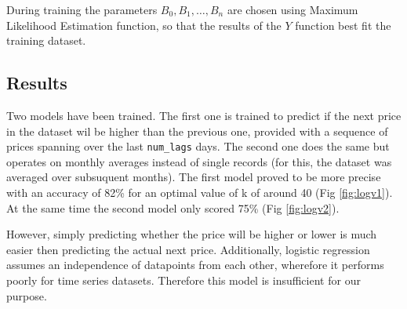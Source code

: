 During training the parameters \(B_0, B_1, \ldots, B_n\) are chosen using Maximum Likelihood Estimation function, so that the results of the \(Y\) function best fit the training dataset.

\subsection{Results}
Two models have been trained.
The first one is trained to predict if the next price in the dataset wil be higher than the previous one, provided with a sequence of prices spanning over the last \verb|num_lags| days.
The second one does the same but operates on monthly averages instead of single records (for this, the dataset was averaged over subsuquent months).
The first model proved to be more precise with an accuracy of 82\% for an optimal value of k of around 40 (Fig \ref{fig:logv1}). At the same time the second model only scored 75\% (Fig \ref{fig:logv2}).

However, simply predicting whether the price will be higher or lower is much easier then predicting the actual next price.
Additionally, logistic regression assumes an independence of datapoints from each other, wherefore it performs poorly for time series datasets.
Therefore this model is insufficient for our purpose.

